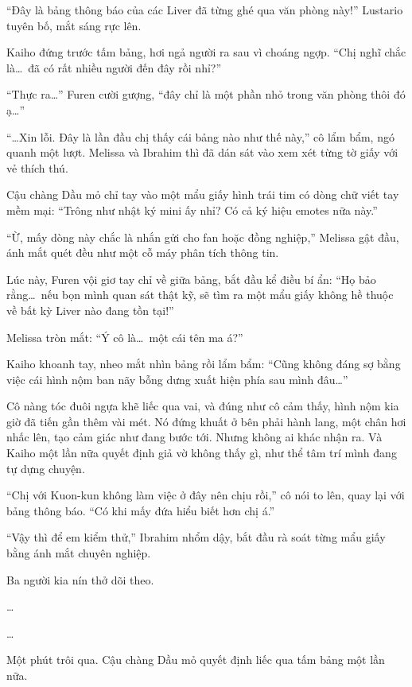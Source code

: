 \documentclass[../main.tex]{subfiles}
\begin{document}

``Đây là bảng thông báo của các Liver đã từng ghé qua văn phòng này!'' Lustario tuyên bố, mắt sáng rực lên.

Kaiho đứng trước tấm bảng, hơi ngả người ra sau vì choáng ngợp. ``Chị nghĩ chắc là\dots\ đã có rất nhiều người đến đây rồi nhỉ?''

``Thực ra\dots'' Furen cười gượng, ``đây chỉ là một phần nhỏ trong văn phòng thôi đó ạ\dots''

``\dots Xin lỗi. Đây là lần đầu chị thấy cái bảng nào như thế này,'' cô lẩm bẩm, ngó quanh một lượt. Melissa và Ibrahim thì đã dán sát vào xem xét từng tờ giấy với vẻ thích thú.

Cậu chàng Dầu mỏ chỉ tay vào một mẩu giấy hình trái tim có dòng chữ viết tay mềm mại: ``Trông như nhật ký mini ấy nhỉ? Có cả ký hiệu emotes nữa này.''

``Ừ, mấy dòng này chắc là nhắn gửi cho fan hoặc đồng nghiệp,'' Melissa gật đầu, ánh mắt quét đều như một cỗ máy phân tích thông tin.

Lúc này, Furen vội giơ tay chỉ về giữa bảng, bắt đầu kể điều bí ẩn: ``Họ bảo rằng\dots\ nếu bọn mình quan sát thật kỹ, sẽ tìm ra một mẩu giấy không hề thuộc về bất kỳ Liver nào đang tồn tại!''

Melissa tròn mắt: ``Ý cô là\dots\ một cái tên ma á?''

Kaiho khoanh tay, nheo mắt nhìn bảng rồi lẩm bẩm: ``Cũng không đáng sợ bằng việc cái hình nộm ban nãy bỗng dưng xuất hiện phía sau mình đâu\dots''

Cô nàng tóc đuôi ngựa khẽ liếc qua vai, và đúng như cô cảm thấy, hình nộm kia giờ đã tiến gần thêm vài mét. Nó đứng khuất ở bên phải hành lang, một chân hơi nhấc lên, tạo cảm giác như đang bước tới. Nhưng không ai khác nhận ra. Và Kaiho một lần nữa quyết định giả vờ không thấy gì, như thể tâm trí mình đang tự dựng chuyện.


``Chị với Kuon-kun không làm việc ở đây nên chịu rồi,'' cô nói to lên, quay lại với bảng thông báo. ``Có khi mấy đứa hiểu biết hơn chị á.''

``Vậy thì để em kiểm thử,'' Ibrahim nhổm dậy, bắt đầu rà soát từng mẩu giấy bằng ánh mắt chuyên nghiệp.

Ba người kia nín thở dõi theo.

\dots

\dots

Một phút trôi qua. Cậu chàng Dầu mỏ quyết định liếc qua tấm bảng một lần nữa.
\end{document}
